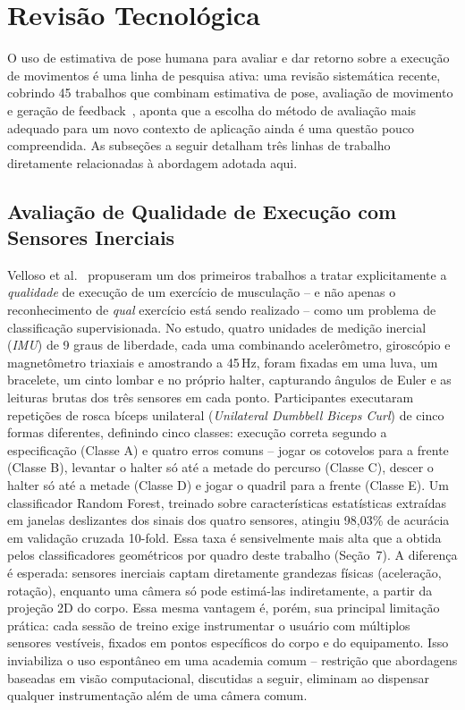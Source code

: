 \documentclass[12pt]{article}
\begin{document}
\section{Revisão Tecnológica}

O uso de estimativa de pose humana para avaliar e dar retorno sobre a
execução de movimentos é uma linha de pesquisa ativa: uma revisão
sistemática recente, cobrindo 45 trabalhos que combinam estimativa de
pose, avaliação de movimento e geração de
feedback~\cite{tharatipyakul2024review}, aponta que a escolha do método de
avaliação mais adequado para um novo contexto de aplicação ainda é uma
questão pouco compreendida. As subseções a seguir detalham três linhas de
trabalho diretamente relacionadas à abordagem adotada aqui.

\subsection{Avaliação de Qualidade de Execução com Sensores Inerciais}

Velloso et al.~\cite{velloso2013hars} propuseram um dos primeiros trabalhos
a tratar explicitamente a \textit{qualidade} de execução de um exercício de
musculação -- e não apenas o reconhecimento de \textit{qual} exercício está
sendo realizado -- como um problema de classificação supervisionada. No
estudo, quatro unidades de medição inercial (\textit{IMU}) de 9 graus de
liberdade, cada uma combinando acelerômetro, giroscópio e magnetômetro
triaxiais e amostrando a 45\,Hz, foram fixadas em uma luva, um bracelete, um
cinto lombar e no próprio halter, capturando ângulos de Euler e as leituras
brutas dos três sensores em cada ponto. Participantes executaram repetições
de rosca bíceps unilateral (\textit{Unilateral Dumbbell Biceps Curl}) de
cinco formas diferentes, definindo cinco classes: execução correta segundo a
especificação (Classe A) e quatro erros comuns -- jogar os cotovelos para a
frente (Classe B), levantar o halter só até a metade do percurso (Classe C),
descer o halter só até a metade (Classe D) e jogar o quadril para a frente
(Classe E). Um classificador Random Forest, treinado sobre características
estatísticas extraídas em janelas deslizantes dos sinais dos quatro
sensores, atingiu 98,03\% de acurácia em validação cruzada 10-fold. Essa
taxa é sensivelmente mais alta que a obtida pelos classificadores
geométricos por quadro deste trabalho (Seção~7). A diferença é esperada:
sensores inerciais captam diretamente grandezas físicas (aceleração,
rotação), enquanto uma câmera só pode estimá-las indiretamente, a partir
da projeção 2D do corpo. Essa mesma vantagem é, porém, sua principal
limitação prática: cada sessão de treino exige instrumentar o usuário com
múltiplos sensores vestíveis, fixados em pontos específicos do corpo e do
equipamento. Isso inviabiliza o uso espontâneo em uma academia comum --
restrição que abordagens baseadas em visão computacional, discutidas a
seguir, eliminam ao dispensar qualquer instrumentação além de uma câmera
comum.
\end{document}
